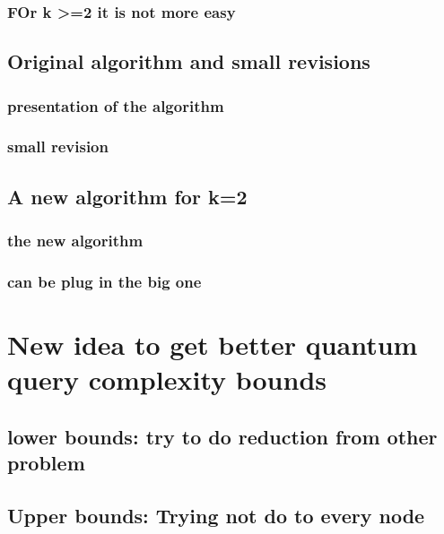\documentclass[9pt, notheorems]{beamer}
\theoremstyle{definition}
\theoremstyle{plain}
\theoremstyle{definition}
\begin{document}
\begin{frame}
    \frametitle{FOr k >=2 it is not more easy}



\end{frame}

\subsection{Original algorithm and small revisions }

\begin{frame}
    \frametitle{presentation of the algorithm}



\end{frame}

\begin{frame}
    \frametitle{small revision}



\end{frame}

\subsection{A new algorithm for k=2}

\begin{frame}
    \frametitle{the new algorithm}



\end{frame}

\begin{frame}
    \frametitle{can be plug in the big one}



\end{frame}

\section{New idea to get better quantum query complexity bounds }

\subsection{lower bounds: try to do reduction from other problem}
\begin{frame}
    \frametitle{}



\end{frame}
\subsection{Upper bounds: Trying not do to every node}
\begin{frame}
    \frametitle{}



\end{frame}
\end{document}

